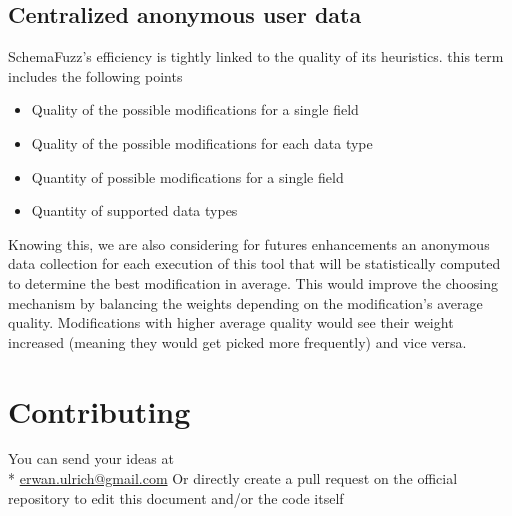\documentclass{article}
\begin{document}
\begin{empfile}
		\subsection{Centralized anonymous user data}
SchemaFuzz's efficiency is tightly linked to the quality of its heuristics. this term includes the following points 
		\begin{itemize}
		\item{Quality of the possible modifications for a single field}
		\item{Quality of the possible modifications for each data type}
		\item{Quantity of possible modifications for a single field}
		\item{Quantity of supported data types}
		\end{itemize}
Knowing this, we are also considering for futures enhancements an anonymous data collection  for each execution of this tool that will be statistically computed to determine the best modification in average. This would improve the choosing mechanism by balancing the weights  depending on the modification's average quality. Modifications with higher average quality would see their weight increased (meaning they would get picked more frequently) and vice versa. 			



	\section{Contributing}
You can send your ideas at  \\*
		\url{erwan.ulrich@gmail.com}
Or directly create a pull request on the official repository to edit this document and/or the code itself


\appendix	
\newpage

	
			
			
\end{empfile}
\end{document}
